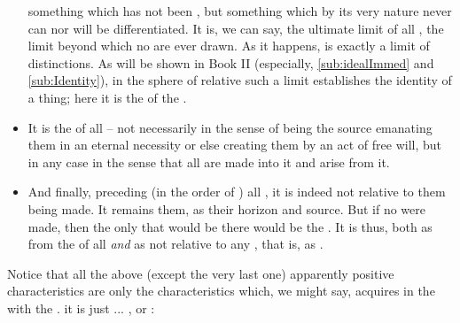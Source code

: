 \begin{itemize}
something which has not been  , but something
which by its very nature never can nor will be differentiated. It is, we can say,
the ultimate limit of all , the limit beyond which no
 are ever drawn. As it happens,  is exactly a limit
of distinctions. As will be shown in Book II (especially, \ref{sub:idealImmed} and
\ref{sub:Identity}), in the sphere of relative  such a limit
establishes the identity of a thing; here it is the  of the
. 
\item  
It is the  of all  -- not necessarily in
the sense of being the source emanating them in an eternal necessity or else
creating them by an act of free will, but in any case in the sense that all
 are made into it and arise from it.
\item
  And finally, preceding (in the order of ) all ,
  it is indeed not relative to them being made. It remains  them, as
  their horizon and source. But if no  were made, then the only
  that would 
  be there would be the . It is thus, both as 
  from the  of all  {\em and} as not relative to
  any , that is, as . 
\end{itemize}
Notice that all the above (except the very last one) apparently positive
characteristics are only the characteristics which, we might say,
 acquires in the  with the .
 it is just ... , or : 

